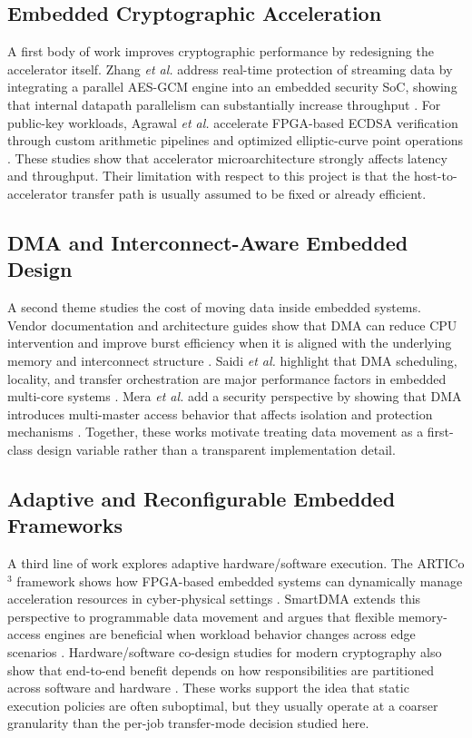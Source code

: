 \documentclass[conference]{IEEEtran}
\begin{document}
\subsection{Embedded Cryptographic Acceleration}
A first body of work improves cryptographic performance by redesigning the accelerator itself. Zhang \emph{et al.} address real-time protection of streaming data by integrating a parallel AES-GCM engine into an embedded security SoC, showing that internal datapath parallelism can substantially increase throughput \cite{zhang2021}. For public-key workloads, Agrawal \emph{et al.} accelerate FPGA-based ECDSA verification through custom arithmetic pipelines and optimized elliptic-curve point operations \cite{agrawal2022}. These studies show that accelerator microarchitecture strongly affects latency and throughput. Their limitation with respect to this project is that the host-to-accelerator transfer path is usually assumed to be fixed or already efficient.

\subsection{DMA and Interconnect-Aware Embedded Design}
A second theme studies the cost of moving data inside embedded systems. Vendor documentation and architecture guides show that DMA can reduce CPU intervention and improve burst efficiency when it is aligned with the underlying memory and interconnect structure \cite{silabs_dma,arm_axi}. Saidi \emph{et al.} highlight that DMA scheduling, locality, and transfer orchestration are major performance factors in embedded multi-core systems \cite{Saidi2012}. Mera \emph{et al.} add a security perspective by showing that DMA introduces multi-master access behavior that affects isolation and protection mechanisms \cite{Mera2022}. Together, these works motivate treating data movement as a first-class design variable rather than a transparent implementation detail.

\subsection{Adaptive and Reconfigurable Embedded Frameworks}
A third line of work explores adaptive hardware/software execution. The ARTICo$^3$ framework shows how FPGA-based embedded systems can dynamically manage acceleration resources in cyber-physical settings \cite{Rodrguez2018}. SmartDMA extends this perspective to programmable data movement and argues that flexible memory-access engines are beneficial when workload behavior changes across edge scenarios \cite{Zulberti2024}. Hardware/software co-design studies for modern cryptography also show that end-to-end benefit depends on how responsibilities are partitioned across software and hardware \cite{Montanaro2022}. These works support the idea that static execution policies are often suboptimal, but they usually operate at a coarser granularity than the per-job transfer-mode decision studied here.
\end{document}
